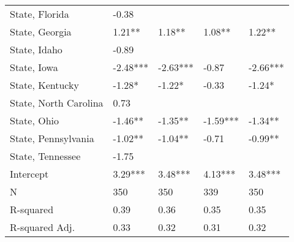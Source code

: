 {\begin{tabular}{lllll}
    State, Florida                         & -0.38    &          &          &          \\
    State, Georgia                         & 1.21**   & 1.18**   & 1.08**   & 1.22**   \\
    State, Idaho                           & -0.89    &          &          &          \\
    State, Iowa                            & -2.48*** & -2.63*** & -0.87    & -2.66*** \\
    State, Kentucky                        & -1.28*   & -1.22*   & -0.33    & -1.24*   \\
    State, North Carolina                  & 0.73     &          &          &          \\
    State, Ohio                            & -1.46**  & -1.35**  & -1.59*** & -1.34**  \\
    State, Pennsylvania                    & -1.02**  & -1.04**  & -0.71    & -0.99**  \\
    State, Tennessee                       & -1.75    &          &          &          \\
    Intercept                              & 3.29***  & 3.48***  & 4.13***  & 3.48***  \\
    \hline
    N                                      & 350      & 350      & 339      & 350      \\
    R-squared                              & 0.39     & 0.36     & 0.35     & 0.35     \\
    R-squared Adj.                         & 0.33     & 0.32     & 0.31     & 0.32     \\
    \hline
\end{tabular}
}
